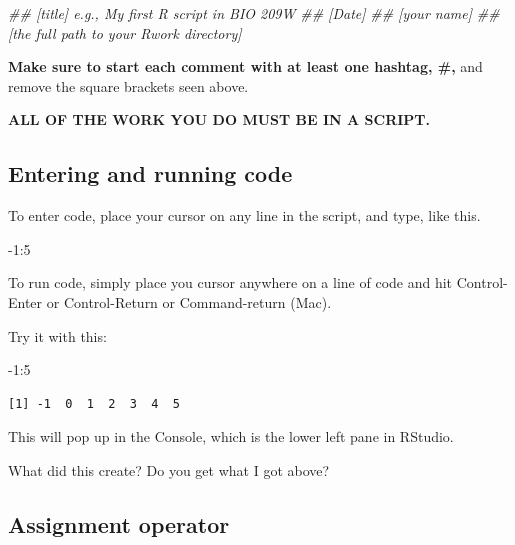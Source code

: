 \documentclass[
  letterpaper,
  DIV=11,
  numbers=noendperiod]{scrreprt}
\newenvironment{Shaded}{\begin{snugshade}}{\end{snugshade}}
\newcommand{\DecValTok}[1]{\textcolor[rgb]{0.68,0.00,0.00}{#1}}
\newcommand{\DocumentationTok}[1]{\textcolor[rgb]{0.37,0.37,0.37}{\textit{#1}}}
\newcommand{\SpecialCharTok}[1]{\textcolor[rgb]{0.37,0.37,0.37}{#1}}
\begin{document}
\begin{Shaded}
\begin{Highlighting}[]
\DocumentationTok{\#\# [title] e.g., My first R script in BIO 209W}
\DocumentationTok{\#\# [Date]}
\DocumentationTok{\#\# [your name]}
\DocumentationTok{\#\# [the full path to your Rwork directory]}
\end{Highlighting}
\end{Shaded}

\textbf{Make sure to start each comment with at least one hashtag, \#,}
and remove the square brackets seen above.

\textbf{ALL OF THE WORK YOU DO MUST BE IN A SCRIPT.}

\subsection{Entering and running code}\label{entering-and-running-code}

To enter code, place your cursor on any line in the script, and type,
like this.

\begin{Shaded}
\begin{Highlighting}[]
\SpecialCharTok{{-}}\DecValTok{1}\SpecialCharTok{:}\DecValTok{5}
\end{Highlighting}
\end{Shaded}

To run code, simply place you cursor anywhere on a line of code and hit
Control-Enter or Control-Return or Command-return (Mac).

Try it with this:

\begin{Shaded}
\begin{Highlighting}[]
\SpecialCharTok{{-}}\DecValTok{1}\SpecialCharTok{:}\DecValTok{5}
\end{Highlighting}
\end{Shaded}

\begin{verbatim}
[1] -1  0  1  2  3  4  5
\end{verbatim}

This will pop up in the Console, which is the lower left pane in
RStudio.

What did this create? Do you get what I got above?

\subsection{Assignment operator}\label{assignment-operator}
\end{document}
